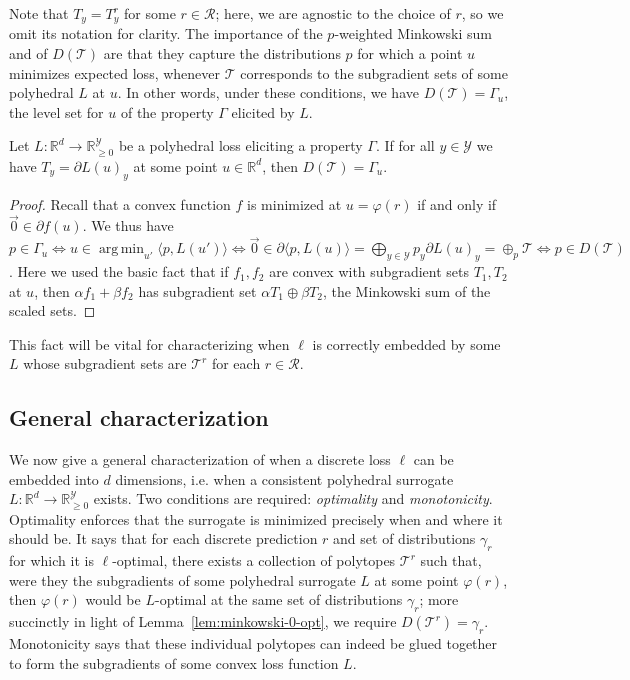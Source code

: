 \documentclass[final]{colt2020} %
\newcommand{\reals}{\mathbb{R}}
\newcommand{\nonnegreals}{\reals_{\geq 0}}%
\newcommand{\R}{\mathcal{R}}
\newcommand{\T}{\mathcal{T}}
\newcommand{\Y}{\mathcal{Y}}
\newcommand{\inprod}[2]{\langle #1, #2 \rangle}%
\DeclareMathOperator*{\argmin}{arg\,min}
\begin{document}
Note that $T_y = T^r_y$ for some $r \in \R$; here, we are agnostic to the choice of $r$, so we omit its notation for clarity.
The importance of the $p$-weighted Minkowski sum and of $D(\T)$ are that they capture the distributions $p$ for which a point $u$ minimizes expected loss, whenever $\T$ corresponds to the subgradient sets of some polyhedral $L$ at $u$.
In other words, under these conditions, we have $D(\T) = \Gamma_u$, the level set for $u$ of the property $\Gamma$ elicited by $L$.
\begin{lemma} \label{lem:minkowski-0-opt}
  Let $L: \reals^d \to \nonnegreals^{\Y}$ be a polyhedral loss eliciting a property $\Gamma$.
  If for all $y\in\Y$ we have $T_y = \partial L(u)_y$ at some point $u\in\reals^d$, then $D(\T) = \Gamma_u$.
\end{lemma}
\begin{proof}
  Recall that a convex function $f$ is minimized at $u = \varphi(r)$ if and only if $\vec 0 \in \partial f(u)$.
  We thus have $p\in\Gamma_u \iff u \in \argmin_{u'} \inprod{p}{L(u')} \iff \vec 0 \in \partial\inprod{p}{L(u)} = \mathop{\bigoplus}_{y\in\Y} p_y \partial L(u)_y = \oplus_p \T \iff p\in D(\T)$.
  Here we used the basic fact that if $f_1,f_2$ are convex with subgradient sets $T_1,T_2$ at $u$, then $\alpha f_1 + \beta f_2$ has subgradient set $\alpha T_1 \oplus \beta T_2$, the Minkowski sum of the scaled sets.
\end{proof}
This fact will be vital for characterizing when $\ell$ is correctly embedded by some $L$ whose subgradient sets are $\T^r$ for each $r \in \R$.

\subsection{General characterization}
\label{subsec:gener-char}

We now give a general characterization of when a discrete loss $\ell$ can be embedded into $d$ dimensions, i.e. when a consistent polyhedral surrogate $L: \reals^d \to \reals^{\Y}_{\geq 0}$ exists.
Two conditions are required: \emph{optimality} and \emph{monotonicity}.
Optimality enforces that the surrogate is minimized precisely when and where it should be.
It says that for each discrete prediction $r$ and set of distributions $\gamma_r$ for which it is $\ell$-optimal, there exists a collection of polytopes $\T^r$ such that, were they the subgradients of some polyhedral surrogate $L$ at some point $\varphi(r)$, then $\varphi(r)$ would be $L$-optimal at the same set of distributions $\gamma_r$; more succinctly in light of Lemma~\ref{lem:minkowski-0-opt}, we require $D(\T^r)=\gamma_r$.
Monotonicity says that these individual polytopes can indeed be glued together to form the subgradients of some convex loss function $L$.
\end{document}
